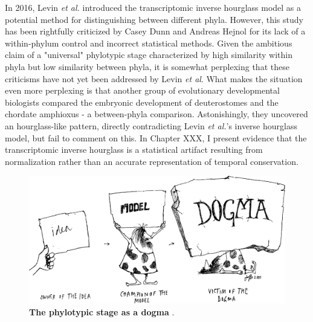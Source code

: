 In 2016, Levin \textit{et al.} introduced the transcriptomic inverse hourglass model as a potential method for distinguishing between different phyla\cite{Levin2016}. However, this study has been rightfully criticized by Casey Dunn and Andreas Hejnol for its lack of a within-phylum control\cite{hejnol2016} and incorrect statistical methods\cite{Dunn2018}. Given the ambitious claim of a "universal" phylotypic stage characterized by high similarity within phyla but low similarity between phyla, it is somewhat perplexing that these criticisms have not yet been addressed by Levin \textit{et al}. What makes the situation even more perplexing is that another group of evolutionary developmental biologists compared the embryonic development of deuterostomes and the chordate amphioxus - a between-phyla comparison. Astonishingly, they uncovered an hourglass-like pattern\cite{PerezPosada2022}, directly contradicting Levin \textit{et al.}'s inverse hourglass model, but fail to comment on this. In Chapter XXX, I present evidence that the transcriptomic inverse hourglass is a statistical artifact resulting from normalization rather than an accurate representation of temporal conservation. 
\begin{figure}[H]
    \includegraphics[width=\linewidth]{ch.discussion/imgs/dogma.png}
    \caption{\textbf{The phylotypic stage as a dogma} \cite{Caveman2000}.}
    \label{fig:dogma}
\end{figure}

